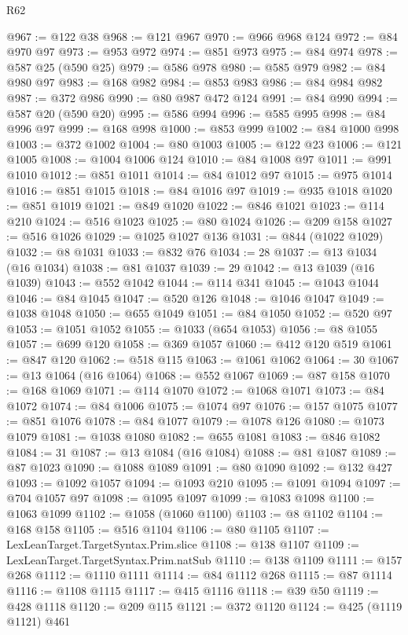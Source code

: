 \begin{lexlean}{R62}
\begin{coremodule}
@967 := @122 @38
@968 := @121 @967
@970 := @966 @968 @124
@972 := @84 @970 @97
@973 := @953 @972
@974 := @851 @973
@975 := @84 @974
@978 := @587 @25 (@590 @25)
@979 := @586 @978
@980 := @585 @979
@982 := @84 @980 @97
@983 := @168 @982
@984 := @853 @983
@986 := @84 @984 @982
@987 := @372 @986
@990 := @80 @987 @472 @124
@991 := @84 @990
@994 := @587 @20 (@590 @20)
@995 := @586 @994
@996 := @585 @995
@998 := @84 @996 @97
@999 := @168 @998
@1000 := @853 @999
@1002 := @84 @1000 @998
@1003 := @372 @1002
@1004 := @80 @1003
@1005 := @122 @23
@1006 := @121 @1005
@1008 := @1004 @1006 @124
@1010 := @84 @1008 @97
@1011 := @991 @1010
@1012 := @851 @1011
@1014 := @84 @1012 @97
@1015 := @975 @1014
@1016 := @851 @1015
@1018 := @84 @1016 @97
@1019 := @935 @1018
@1020 := @851 @1019
@1021 := @849 @1020
@1022 := @846 @1021
@1023 := @114 @210
@1024 := @516 @1023
@1025 := @80 @1024
@1026 := @209 @158
@1027 := @516 @1026
@1029 := @1025 @1027 @136
@1031 := @844 (@1022 @1029)
@1032 := @8 @1031
@1033 := @832 @76
@1034 := 28
@1037 := @13 @1034 (@16 @1034)
@1038 := @81 @1037
@1039 := 29
@1042 := @13 @1039 (@16 @1039)
@1043 := @552 @1042
@1044 := @114 @341
@1045 := @1043 @1044
@1046 := @84 @1045
@1047 := @520 @126
@1048 := @1046 @1047
@1049 := @1038 @1048
@1050 := @655 @1049
@1051 := @84 @1050
@1052 := @520 @97
@1053 := @1051 @1052
@1055 := @1033 (@654 @1053)
@1056 := @8 @1055
@1057 := @699 @120
@1058 := @369 @1057
@1060 := @412 @120 @519
@1061 := @847 @120
@1062 := @518 @115
@1063 := @1061 @1062
@1064 := 30
@1067 := @13 @1064 (@16 @1064)
@1068 := @552 @1067
@1069 := @87 @158
@1070 := @168 @1069
@1071 := @114 @1070
@1072 := @1068 @1071
@1073 := @84 @1072
@1074 := @84 @1006
@1075 := @1074 @97
@1076 := @157 @1075
@1077 := @851 @1076
@1078 := @84 @1077
@1079 := @1078 @126
@1080 := @1073 @1079
@1081 := @1038 @1080
@1082 := @655 @1081
@1083 := @846 @1082
@1084 := 31
@1087 := @13 @1084 (@16 @1084)
@1088 := @81 @1087
@1089 := @87 @1023
@1090 := @1088 @1089
@1091 := @80 @1090
@1092 := @132 @427
@1093 := @1092 @1057
@1094 := @1093 @210
@1095 := @1091 @1094
@1097 := @704 @1057 @97
@1098 := @1095 @1097
@1099 := @1083 @1098
@1100 := @1063 @1099
@1102 := @1058 (@1060 @1100)
@1103 := @8 @1102
@1104 := @168 @158
@1105 := @516 @1104
@1106 := @80 @1105
@1107 := LexLeanTarget.TargetSyntax.Prim.slice
@1108 := @138 @1107
@1109 := LexLeanTarget.TargetSyntax.Prim.natSub
@1110 := @138 @1109
@1111 := @157 @268
@1112 := @1110 @1111
@1114 := @84 @1112 @268
@1115 := @87 @1114
@1116 := @1108 @1115
@1117 := @415 @1116
@1118 := @39 @50
@1119 := @428 @1118
@1120 := @209 @115
@1121 := @372 @1120
@1124 := @425 (@1119 @1121) @461

\end{coremodule}
\end{lexlean}
